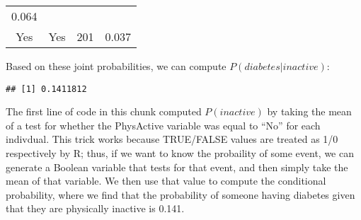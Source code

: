 \documentclass[]{book}
\newenvironment{Shaded}{\begin{snugshade}}{\end{snugshade}}
\newcommand{\KeywordTok}[1]{\textcolor[rgb]{0.13,0.29,0.53}{\textbf{#1}}}
\newcommand{\StringTok}[1]{\textcolor[rgb]{0.31,0.60,0.02}{#1}}
\newcommand{\CommentTok}[1]{\textcolor[rgb]{0.56,0.35,0.01}{\textit{#1}}}
\newcommand{\OperatorTok}[1]{\textcolor[rgb]{0.81,0.36,0.00}{\textbf{#1}}}
\newcommand{\NormalTok}[1]{#1}
\theoremstyle{definition}
\theoremstyle{definition}
\theoremstyle{definition}
\theoremstyle{remark}
\begin{document}
\begin{longtable}[]{@{}cccc@{}}
\begin{minipage}[t]{0.09\columnwidth}
0.064\strut
\end{minipage}\tabularnewline
\begin{minipage}[t]{0.14\columnwidth}\centering\strut
Yes\strut
\end{minipage} & \begin{minipage}[t]{0.16\columnwidth}\centering\strut
Yes\strut
\end{minipage} & \begin{minipage}[t]{0.09\columnwidth}\centering\strut
201\strut
\end{minipage} & \begin{minipage}[t]{0.09\columnwidth}\centering\strut
0.037\strut
\end{minipage}\tabularnewline
\bottomrule
\end{longtable}

Based on these joint probabilities, we can compute
\(P(diabetes|inactive)\):

\begin{Shaded}
\end{Shaded}

\begin{verbatim}
## [1] 0.1411812
\end{verbatim}

The first line of code in this chunk computed \(P(inactive)\) by taking
the mean of a test for whether the PhysActive variable was equal to
``No'' for each indivdual. This trick works because TRUE/FALSE values
are treated as 1/0 respectively by R; thus, if we want to know the
probaility of some event, we can generate a Boolean variable that tests
for that event, and then simply take the mean of that variable. We then
use that value to compute the conditional probability, where we find
that the probability of someone having diabetes given that they are
physically inactive is 0.141.
\end{document}
